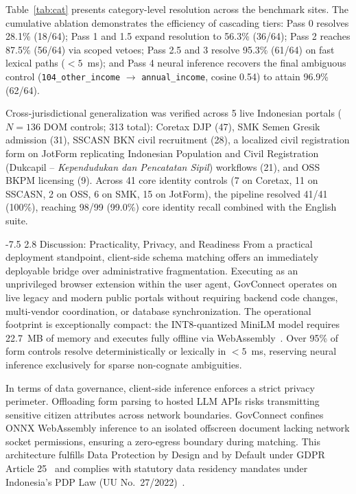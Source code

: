 \documentclass[runningheads,a4paper]{llncs}
\makeatletter
\renewcommand\section{\@startsection{section}{1}{\z@}%
  {-7.5\p@ \@plus -2\p@ \@minus -1\p@}%
  {2.8\p@ \@plus 1\p@}%
  {\normalfont\large\bfseries}}
\makeatother
\begin{document}
Table~\ref{tab:cat} presents category-level resolution across the benchmark sites. The cumulative ablation demonstrates the efficiency of cascading tiers: Pass 0 resolves 28.1\% (18/64); Pass 1 and 1.5 expand resolution to 56.3\% (36/64); Pass 2 reaches 87.5\% (56/64) via scoped vetoes; Pass 2.5 and 3 resolve 95.3\% (61/64) on fast lexical paths ($<5$~ms); and Pass 4 neural inference recovers the final ambiguous control (\texttt{104\_other\_income} $\to$ \texttt{annual\_income}, cosine 0.54) to attain 96.9\% (62/64).

Cross-jurisdictional generalization was verified across 5 live Indonesian portals ($N = 136$ DOM controls; 313 total): Coretax DJP (47), SMK Semen Gresik admission (31), SSCASN BKN civil recruitment (28), a localized civil registration form on JotForm replicating Indonesian Population and Civil Registration (Dukcapil -- \emph{Kependudukan dan Pencatatan Sipil}) workflows (21), and OSS BKPM licensing (9). Across 41 core identity controls (7 on Coretax, 11 on SSCASN, 2 on OSS, 6 on SMK, 15 on JotForm), the pipeline resolved 41/41 (100\%), reaching 98/99 (99.0\%) core identity recall combined with the English suite.

\section{Discussion: Practicality, Privacy, and Readiness}
From a practical deployment standpoint, client-side schema matching offers an immediately deployable bridge over administrative fragmentation. Executing as an unprivileged browser extension within the user agent, GovConnect operates on live legacy and modern public portals without requiring backend code changes, multi-vendor coordination, or database synchronization. The operational footprint is exceptionally compact: the INT8-quantized MiniLM model requires 22.7~MB of memory and executes fully offline via WebAssembly~\cite{onnxweb,transformersjs}. Over 95\% of form controls resolve deterministically or lexically in $<5$~ms, reserving neural inference exclusively for sparse non-cognate ambiguities.

In terms of data governance, client-side inference enforces a strict privacy perimeter. Offloading form parsing to hosted LLM APIs risks transmitting sensitive citizen attributes across network boundaries. GovConnect confines ONNX WebAssembly inference to an isolated offscreen document lacking network socket permissions, ensuring a zero-egress boundary during matching. This architecture fulfills Data Protection by Design and by Default under GDPR Article 25~\cite{gdpr} and complies with statutory data residency mandates under Indonesia's PDP Law (UU No.~27/2022)~\cite{uupdp}.
\end{document}
